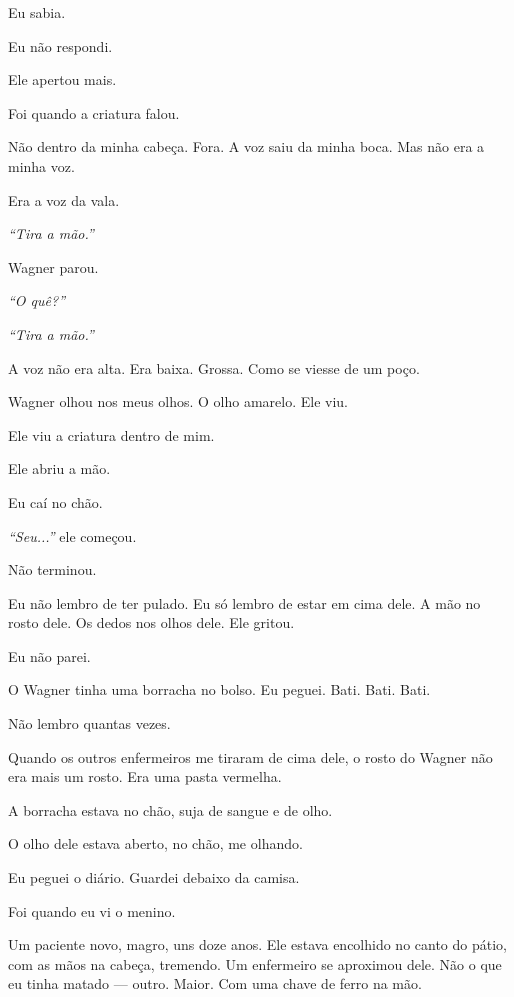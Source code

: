 \noindent Eu sabia.

\noindent Eu não respondi.

\noindent Ele apertou mais.

\noindent Foi quando a criatura falou.

\noindent Não dentro da minha cabeça. Fora. A voz saiu da minha boca. Mas não era a minha voz.

\noindent Era a voz da vala.

\noindent \textit{\textquotedblleft{}Tira a mão.\textquotedblright{}}

\noindent Wagner parou.

\noindent \textit{\textquotedblleft{}O quê?\textquotedblright{}}

\noindent \textit{\textquotedblleft{}Tira a mão.\textquotedblright{}}

\noindent A voz não era alta. Era baixa. Grossa. Como se viesse de um poço.

\noindent Wagner olhou nos meus olhos. O olho amarelo. Ele viu.

\noindent Ele viu a criatura dentro de mim.

\noindent Ele abriu a mão.

\noindent Eu caí no chão.

\noindent \textit{\textquotedblleft{}Seu...\textquotedblright{}} ele começou.

\noindent Não terminou.

\noindent Eu não lembro de ter pulado. Eu só lembro de estar em cima dele. A mão no rosto dele. Os dedos nos olhos dele. Ele gritou.

\noindent Eu não parei.

\noindent O Wagner tinha uma borracha no bolso. Eu peguei. Bati. Bati. Bati.

\noindent Não lembro quantas vezes.

\noindent Quando os outros enfermeiros me tiraram de cima dele, o rosto do Wagner não era mais um rosto. Era uma pasta vermelha.

\noindent A borracha estava no chão, suja de sangue e de olho.

\noindent O olho dele estava aberto, no chão, me olhando.

\noindent Eu peguei o diário. Guardei debaixo da camisa.

\noindent Foi quando eu vi o menino.

\noindent Um paciente novo, magro, uns doze anos. Ele estava encolhido no canto do pátio, com as mãos na cabeça, tremendo. Um enfermeiro se aproximou dele. Não o que eu tinha matado --- outro. Maior. Com uma chave de ferro na mão.

